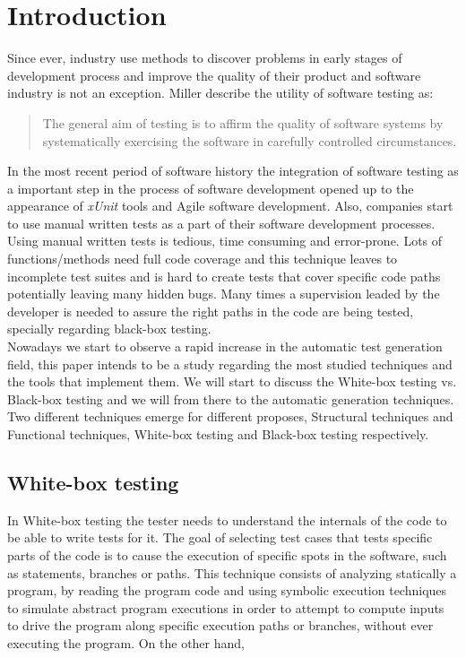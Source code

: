 \documentclass[10pt, conference, compsocconf]{IEEEtran}
\newcommand{\xunit}{\textit{xUnit}}
\begin{document}
\section{Introduction}
Since ever, industry use methods to discover problems in early stages of development process and improve
the quality of their product and software industry is not an exception. Miller\cite{miller} describe the utility
of software testing as:

\begin{quotation}
The general aim of testing is to affirm the quality of software systems by systematically
exercising the software in carefully controlled circumstances.
\end{quotation}

In the most recent period of software history the integration of software testing as a important step in the process of
software development opened up to the appearance of \xunit\cite{xunit} tools and Agile software development.
Also, companies start to use manual written tests as a part of their software development processes.\\
Using  manual written tests is tedious, time consuming and error-prone. Lots of functions/methods need full code coverage and this technique leaves
to incomplete test suites and is hard to create tests that cover specific code paths potentially leaving many hidden bugs. Many times a supervision leaded by the developer
is needed to assure the right paths in the code are being tested, specially regarding black-box testing.\\
\indent Nowadays we start to observe a rapid increase in the automatic test generation field, this paper intends to be a study regarding the most studied techniques
and the tools that implement them. We will start to discuss the White-box testing vs. Black-box testing and we will from there to the automatic generation techniques.\\

Two different techniques emerge for different proposes, Structural techniques and Functional techniques,
White-box testing and Black-box\cite{black} testing respectively.

\subsection{White-box testing}
In White-box testing the tester needs to understand the internals of the code to be able to write tests for it.
The goal of selecting test cases that tests specific parts of the code is to cause the execution of specific spots in the software, such as statements, branches or
paths. This technique consists of analyzing statically a program, by reading the program code and using symbolic execution techniques to simulate abstract program
executions in order to attempt to compute inputs to drive the program along specific execution paths or branches, without ever executing the program.
On the other hand,
\end{document}
